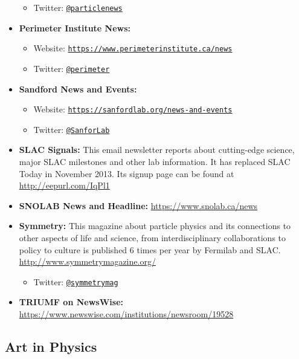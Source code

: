 \begin{itemize}
  \begin{itemize}
  \tightlist
  \item
    Twitter:
    \href{https://twitter.com/particlenews}{\texttt{@particlenews}}
  \end{itemize}
\item
  \textbf{Perimeter Institute News:}

  \begin{itemize}
  \tightlist
  \item
    Website:
    \href{https://www.perimeterinstitute.ca/news}{\texttt{https://www.perimeterinstitute.ca/news}}
  \item
    Twitter: \href{https://twitter.com/perimeter}{\texttt{@perimeter}}
  \end{itemize}
\item
  \textbf{Sandford News and Events:}

  \begin{itemize}
  \tightlist
  \item
    Website:
    \href{https://sanfordlab.org/news-and-events}{\texttt{https://sanfordlab.org/news-and-events}}
  \item
    Twitter: \href{https://twitter.com/SanfordLab}{\texttt{@SanforLab}}
  \end{itemize}
\item
  \textbf{SLAC Signals:} This email newsletter reports about
  cutting-edge science, major SLAC milestones and other lab information.
  It has replaced SLAC Today in November 2013. Its signup page can be
  found at \url{http://eepurl.com/IqPl1}
\item
  \textbf{SNOLAB News and Headline:} \url{https://www.snolab.ca/news}
\item
  \textbf{Symmetry:} This magazine about particle physics and its
  connections to other aspects of life and science, from
  interdisciplinary collaborations to policy to culture is published 6
  times per year by Fermilab and SLAC.
  \url{http://www.symmetrymagazine.org/}

  \begin{itemize}
  \tightlist
  \item
    Twitter:
    \href{https://twitter.com/symmetrymag}{\texttt{@symmetrymag}}
  \end{itemize}
\item
  \textbf{TRIUMF on NewsWise:}
  \url{https://www.newswise.com/institutions/newsroom/19528}
\end{itemize}

\subsection{Art in Physics}\label{databases:subsec:art}

